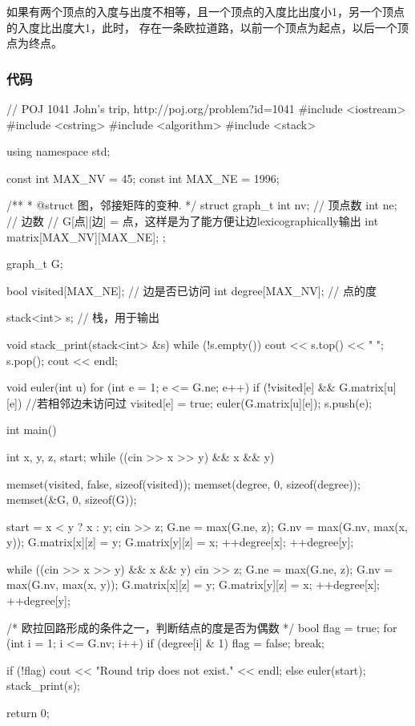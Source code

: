 如果有两个顶点的入度与出度不相等，且一个顶点的入度比出度小1，另一个顶点的入度比出度大1，此时，
存在一条欧拉道路，以前一个顶点为起点，以后一个顶点为终点。


\subsubsection{代码}
\begin{Codex}[label=round_trip.cpp]
// POJ 1041 John's trip, http://poj.org/problem?id=1041
#include <iostream>
#include <cstring>
#include <algorithm>
#include <stack>

using namespace std;

const int MAX_NV = 45;
const int MAX_NE = 1996;

/**
 * @struct 图，邻接矩阵的变种.
 */
struct graph_t {
    int nv; // 顶点数
    int ne; // 边数
    // G[点][边] = 点，这样是为了能方便让边lexicographically输出
    int matrix[MAX_NV][MAX_NE];
};

graph_t G;

bool visited[MAX_NE];  // 边是否已访问
int degree[MAX_NV];    // 点的度

stack<int> s;  // 栈，用于输出

void stack_print(stack<int> &s) {
    while (!s.empty()) {
        cout << s.top() << " ";
        s.pop();
    }
    cout << endl;
}

void euler(int u) {
    for (int e = 1; e <= G.ne; e++) {
        if (!visited[e] && G.matrix[u][e]) { //若相邻边未访问过
            visited[e] = true;
            euler(G.matrix[u][e]);
            s.push(e);
        }
    }
}

int main() {
    int x, y, z, start;
    while ((cin >> x >> y) && x && y) {
        memset(visited, false, sizeof(visited));
        memset(degree, 0, sizeof(degree));
        memset(&G, 0, sizeof(G));

        start = x < y ? x : y;
        cin >> z;
        G.ne = max(G.ne, z);
        G.nv = max(G.nv, max(x, y));
        G.matrix[x][z] = y;
        G.matrix[y][z] = x;
        ++degree[x];
        ++degree[y];

        while ((cin >> x >> y) && x && y) {
            cin >> z;
            G.ne = max(G.ne, z);
            G.nv = max(G.nv, max(x, y));
            G.matrix[x][z] = y;
            G.matrix[y][z] = x;
            ++degree[x];
            ++degree[y];
        }

        /* 欧拉回路形成的条件之一，判断结点的度是否为偶数 */
        bool flag = true;
        for (int i = 1; i <= G.nv; i++) {
            if (degree[i] & 1) {
                flag = false;
                break;
            }
        }

        if (!flag) {
            cout << "Round trip does not exist." << endl;
        } else {
            euler(start);
            stack_print(s);
        }
    }
    return 0;
}
\end{Codex}


